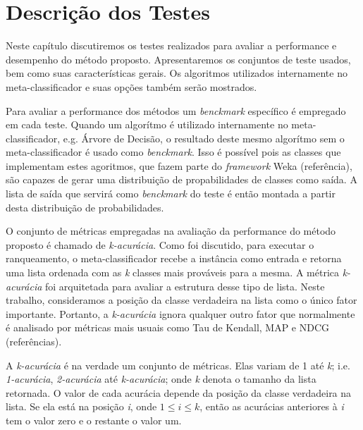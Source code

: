 \chapter{Descrição dos Testes}

Neste capítulo discutiremos os testes realizados para avaliar a performance e desempenho do método proposto.
Apresentaremos os conjuntos de teste usados, bem como suas características gerais. 
Os algoritmos utilizados internamente no meta-classificador e suas opções também serão mostrados.

Para avaliar a performance dos métodos um \textit{benckmark} específico é empregado em cada teste.
Quando um algorítmo é utilizado internamente no meta-classificador, e.g. Árvore de Decisão, o resultado deste mesmo algorítmo sem o meta-classificador é usado como \textit{benckmark}.
Isso é possível pois as classes que implementam estes agoritmos, que fazem parte do \textit{framework} Weka (referência), são capazes de gerar uma distribuição de propabilidades de classes como saída.
A lista de saída que servirá como \textit{benckmark} do teste é então montada a partir desta distribuição de probabilidades.


O conjunto de métricas empregadas na avaliação da performance do método proposto é chamado de \textit{k-acurácia}. 
Como foi discutido, para executar o ranqueamento, o meta-classificador recebe a instância como entrada e retorna uma lista ordenada com as \textit{k} classes mais prováveis para a mesma.
A métrica \textit{k-acurácia} foi arquitetada para avaliar a estrutura desse tipo de lista.
Neste trabalho, consideramos a posição da classe verdadeira na lista como o único fator importante.
Portanto, a \textit{k-acurácia} ignora qualquer outro fator que normalmente é analisado por métricas mais usuais como Tau de Kendall, MAP e NDCG (referências).

A \textit{k-acurácia} é na verdade um conjunto de métricas. 
Elas variam de 1 até \textit{k}; i.e. \textit{1-acurácia}, \textit{2-acurácia} até \textit{k-acurácia}; onde \textit{k} denota o tamanho da lista retornada.
O valor de cada acurácia depende da posição da classe verdadeira na lista.
Se ela está na posição \textit{i}, onde $1 \leq \textit{i} \leq \textit{k}$, então as acurácias anteriores à \textit{i} tem o valor zero e o restante o valor um.


